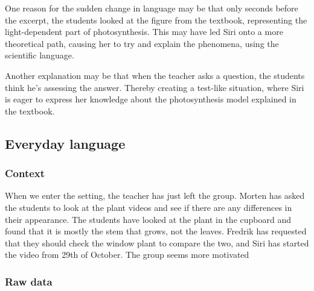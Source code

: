 One reason for the sudden change in language may be that only seconds before the excerpt, the students looked at the figure from the textbook, representing the light-dependent part of photosynthesis. This may have led Siri onto a more theoretical path, causing her to try and explain the phenomena, using the scientific language. 

Another explanation may be that when the teacher asks a question, the students think he's assessing the answer. Thereby creating a test-like situation, where Siri is eager to express her knowledge about the photosynthesis model explained in the textbook. 



\subsection{Everyday language}


\subsubsection*{Context}
When we enter the setting, the teacher has just left the group. Morten has asked the students to look at the plant videos and see if there are any differences in their appearance. The students have looked at the plant in the cupboard and found that it is mostly the stem that grows, not the leaves. Fredrik has requested that they should check the window plant to compare the two, and Siri has started the video from 29th of October. The group seems more motivated 


\subsubsection*{Raw data}

